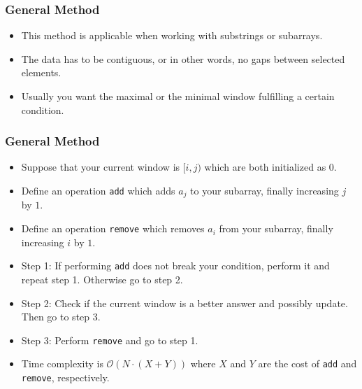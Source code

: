 \documentclass{beamer}
\begin{document}
\begin{frame}
    \frametitle{General Method}
    \begin{itemize}
        \item<1->  This method is applicable when working with substrings or subarrays.
        \item<1->  The data has to be contiguous, or in other words, no gaps between selected elements.
        \item<1->  Usually you want the maximal or the minimal window fulfilling a certain condition.
    \end{itemize}
\end{frame}

\begin{frame}
    \frametitle{General Method}
    \begin{itemize}
        \item<1->  Suppose that your current window is $[i, j)$ which are both initialized as $0$.
        \item<2->  Define an operation \texttt{add} which adds $a_j$ to your subarray, finally increasing $j$ by $1$.
        \item<2->  Define an operation \texttt{remove} which removes $a_i$ from your subarray, finally increasing $i$ by $1$.
        \item<3->  Step 1: If performing \texttt{add} does not break your condition, perform it and repeat step 1. Otherwise go to step 2.
        \item<3->  Step 2: Check if the current window is a better answer and possibly update. Then go to step 3.
        \item<3->  Step 3: Perform \texttt{remove} and go to step 1.
        \item<4->  Time complexity is $\mathcal{O}(N \cdot (X + Y))$ where $X$ and $Y$ are the cost of \texttt{add} and \texttt{remove}, respectively.
    \end{itemize}
\end{frame}
\end{document}

